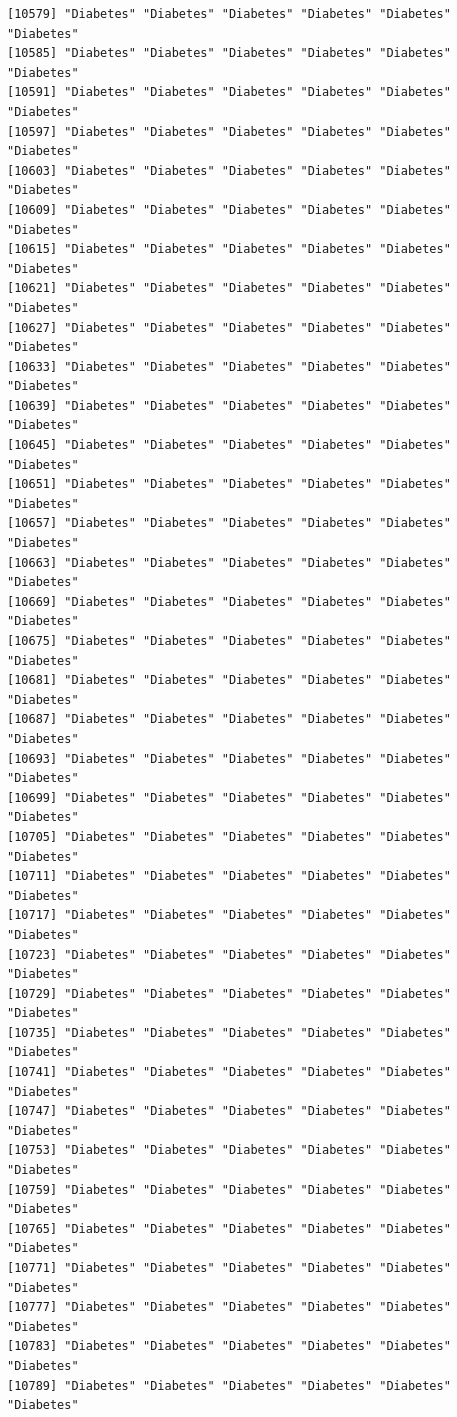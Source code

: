 \documentclass[
  letterpaper,
  DIV=11,
  numbers=noendperiod]{scrartcl}
\begin{document}
\begin{verbatim}
[10579] "Diabetes" "Diabetes" "Diabetes" "Diabetes" "Diabetes" "Diabetes"
[10585] "Diabetes" "Diabetes" "Diabetes" "Diabetes" "Diabetes" "Diabetes"
[10591] "Diabetes" "Diabetes" "Diabetes" "Diabetes" "Diabetes" "Diabetes"
[10597] "Diabetes" "Diabetes" "Diabetes" "Diabetes" "Diabetes" "Diabetes"
[10603] "Diabetes" "Diabetes" "Diabetes" "Diabetes" "Diabetes" "Diabetes"
[10609] "Diabetes" "Diabetes" "Diabetes" "Diabetes" "Diabetes" "Diabetes"
[10615] "Diabetes" "Diabetes" "Diabetes" "Diabetes" "Diabetes" "Diabetes"
[10621] "Diabetes" "Diabetes" "Diabetes" "Diabetes" "Diabetes" "Diabetes"
[10627] "Diabetes" "Diabetes" "Diabetes" "Diabetes" "Diabetes" "Diabetes"
[10633] "Diabetes" "Diabetes" "Diabetes" "Diabetes" "Diabetes" "Diabetes"
[10639] "Diabetes" "Diabetes" "Diabetes" "Diabetes" "Diabetes" "Diabetes"
[10645] "Diabetes" "Diabetes" "Diabetes" "Diabetes" "Diabetes" "Diabetes"
[10651] "Diabetes" "Diabetes" "Diabetes" "Diabetes" "Diabetes" "Diabetes"
[10657] "Diabetes" "Diabetes" "Diabetes" "Diabetes" "Diabetes" "Diabetes"
[10663] "Diabetes" "Diabetes" "Diabetes" "Diabetes" "Diabetes" "Diabetes"
[10669] "Diabetes" "Diabetes" "Diabetes" "Diabetes" "Diabetes" "Diabetes"
[10675] "Diabetes" "Diabetes" "Diabetes" "Diabetes" "Diabetes" "Diabetes"
[10681] "Diabetes" "Diabetes" "Diabetes" "Diabetes" "Diabetes" "Diabetes"
[10687] "Diabetes" "Diabetes" "Diabetes" "Diabetes" "Diabetes" "Diabetes"
[10693] "Diabetes" "Diabetes" "Diabetes" "Diabetes" "Diabetes" "Diabetes"
[10699] "Diabetes" "Diabetes" "Diabetes" "Diabetes" "Diabetes" "Diabetes"
[10705] "Diabetes" "Diabetes" "Diabetes" "Diabetes" "Diabetes" "Diabetes"
[10711] "Diabetes" "Diabetes" "Diabetes" "Diabetes" "Diabetes" "Diabetes"
[10717] "Diabetes" "Diabetes" "Diabetes" "Diabetes" "Diabetes" "Diabetes"
[10723] "Diabetes" "Diabetes" "Diabetes" "Diabetes" "Diabetes" "Diabetes"
[10729] "Diabetes" "Diabetes" "Diabetes" "Diabetes" "Diabetes" "Diabetes"
[10735] "Diabetes" "Diabetes" "Diabetes" "Diabetes" "Diabetes" "Diabetes"
[10741] "Diabetes" "Diabetes" "Diabetes" "Diabetes" "Diabetes" "Diabetes"
[10747] "Diabetes" "Diabetes" "Diabetes" "Diabetes" "Diabetes" "Diabetes"
[10753] "Diabetes" "Diabetes" "Diabetes" "Diabetes" "Diabetes" "Diabetes"
[10759] "Diabetes" "Diabetes" "Diabetes" "Diabetes" "Diabetes" "Diabetes"
[10765] "Diabetes" "Diabetes" "Diabetes" "Diabetes" "Diabetes" "Diabetes"
[10771] "Diabetes" "Diabetes" "Diabetes" "Diabetes" "Diabetes" "Diabetes"
[10777] "Diabetes" "Diabetes" "Diabetes" "Diabetes" "Diabetes" "Diabetes"
[10783] "Diabetes" "Diabetes" "Diabetes" "Diabetes" "Diabetes" "Diabetes"
[10789] "Diabetes" "Diabetes" "Diabetes" "Diabetes" "Diabetes" "Diabetes"

\end{verbatim}
\end{document}
